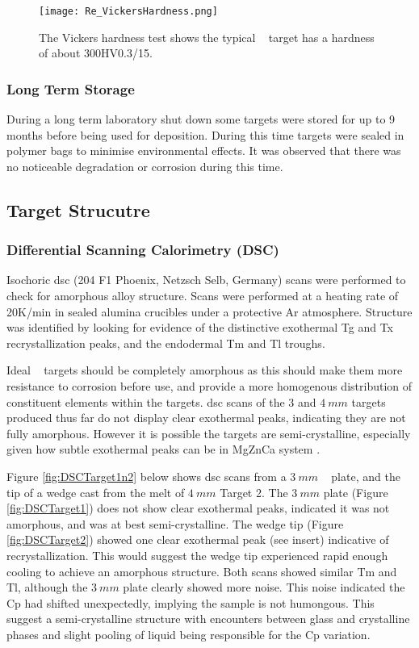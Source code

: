 \documentclass[a4paper,12pt,oneside]{report}%
\begin{document}
\begin{figure}[htbp]
	\centering
	\texttt{[image: Re\_VickersHardness.png]}
	\caption{The Vickers hardness test shows the typical \MgZnCa~ target has a hardness of about 300HV0.3/15.}
	\label{fig:TargetHV}
\end{figure}

\subsubsection{Long Term Storage}
During a long term laboratory shut down some targets were stored for up to 9 months before being used for deposition. During this time targets were sealed in polymer bags to minimise environmental effects. It was observed that there was no noticeable degradation or corrosion during this time.  

\subsection{Target Strucutre} 
\subsubsection{Differential Scanning Calorimetry (DSC)}
Isochoric \gls{dsc} (204 F1 Phoenix, Netzsch Selb, Germany) scans were performed to check for amorphous alloy structure. Scans were performed at a heating rate of 20K/min in sealed alumina crucibles under a protective Ar atmosphere. Structure was identified by looking for evidence of the distinctive exothermal \gls{Tg} and \gls{Tx} recrystallization peaks, and the endodermal \gls{Tm} and \gls{Tl} troughs.

Ideal \MgZnCa~ targets should be completely amorphous as this should make them more resistance to corrosion before use, and provide a more homogenous distribution of constituent elements within the targets. \Gls{dsc} scans of the $3$ and $4~ mm$ targets produced thus far do not display clear exothermal peaks, indicating they are not fully amorphous. However it is possible the targets are semi-crystalline, especially given how subtle exothermal peaks can be in MgZnCa system \cite{Gu2010}. 

Figure \ref{fig:DSCTarget1n2} below shows \gls{dsc} scans from a $3~ mm$ \MgZnCa~ plate, and the tip of a wedge cast from the melt of $4~ mm$ Target 2. The $3~ mm$ plate (Figure \ref{fig:DSCTarget1}) does not show clear exothermal peaks, indicated it was not amorphous, and was at best semi-crystalline. The wedge tip (Figure \ref{fig:DSCTarget2}) showed one clear exothermal peak (see insert) indicative of recrystallization. This would suggest the wedge tip experienced rapid enough cooling to achieve an amorphous structure. Both scans showed similar \gls{Tm} and \gls{Tl}, although the $3~ mm$ plate clearly showed more noise. This noise indicated the \gls{Cp} had shifted unexpectedly, implying the sample is not humongous. This suggest a semi-crystalline structure with encounters between glass and crystalline phases and slight pooling of liquid being responsible for the \gls{Cp} variation.
\end{document}
